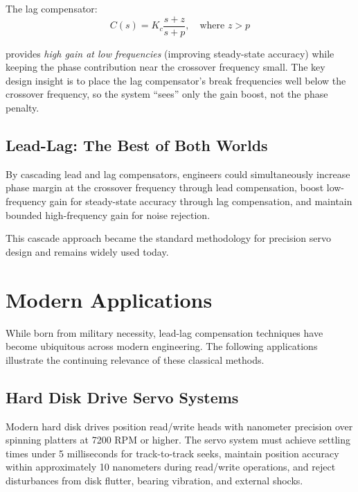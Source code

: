 The lag compensator:
\begin{equation}
C(s) = K_c \frac{s + z}{s + p}, \quad \text{where } z > p
\label{eq:lag_compensator_intro}
\end{equation}

provides \textit{high gain at low frequencies} (improving steady-state accuracy) while keeping the phase contribution near the crossover frequency small. The key design insight is to place the lag compensator's break frequencies well below the crossover frequency, so the system ``sees'' only the gain boost, not the phase penalty.

\subsection{Lead-Lag: The Best of Both Worlds}

By cascading lead and lag compensators, engineers could simultaneously increase phase margin at the crossover frequency through lead compensation, boost low-frequency gain for steady-state accuracy through lag compensation, and maintain bounded high-frequency gain for noise rejection.

This cascade approach became the standard methodology for precision servo design and remains widely used today.

\section{Modern Applications}
\label{sec:lead_lag_applications}

While born from military necessity, lead-lag compensation techniques have become ubiquitous across modern engineering. The following applications illustrate the continuing relevance of these classical methods.

\subsection{Hard Disk Drive Servo Systems}

Modern hard disk drives position read/write heads with nanometer precision over spinning platters at 7200 RPM or higher. The servo system must achieve settling times under 5 milliseconds for track-to-track seeks, maintain position accuracy within approximately 10 nanometers during read/write operations, and reject disturbances from disk flutter, bearing vibration, and external shocks.

